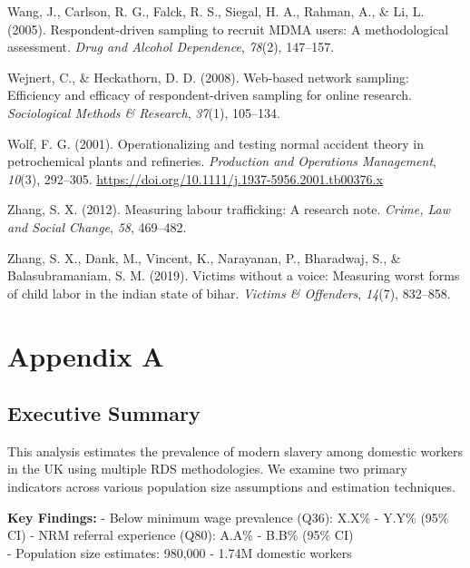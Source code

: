 \documentclass[
  12pt,
]{article}
\newlength{\cslhangindent}
\newenvironment{CSLReferences}[2] %
 {\begin{list}{}{%
  \setlength{\itemindent}{0pt}
  \setlength{\leftmargin}{0pt}
  \setlength{\parsep}{0pt}
  \ifodd #1
   \setlength{\leftmargin}{\cslhangindent}
   \setlength{\itemindent}{-1\cslhangindent}
  \fi
  \setlength{\itemsep}{#2\baselineskip}}}
 {\end{list}}
\theoremstyle{plain}
\theoremstyle{definition}
\begin{document}
\begin{CSLReferences}{1}{0}
Wang, J., Carlson, R. G., Falck, R. S., Siegal, H. A., Rahman, A., \&
Li, L. (2005). Respondent-driven sampling to recruit {MDMA} users: A
methodological assessment. \emph{Drug and Alcohol Dependence},
\emph{78}(2), 147--157.

Wejnert, C., \& Heckathorn, D. D. (2008). Web-based network sampling:
Efficiency and efficacy of respondent-driven sampling for online
research. \emph{Sociological Methods \& Research}, \emph{37}(1),
105--134.

Wolf, F. G. (2001). Operationalizing and testing normal accident theory
in petrochemical plants and refineries. \emph{Production and Operations
Management}, \emph{10}(3), 292--305.
\url{https://doi.org/10.1111/j.1937-5956.2001.tb00376.x}

Zhang, S. X. (2012). Measuring labour trafficking: A research note.
\emph{Crime, Law and Social Change}, \emph{58}, 469--482.

Zhang, S. X., Dank, M., Vincent, K., Narayanan, P., Bharadwaj, S., \&
Balasubramaniam, S. M. (2019). Victims without a voice: Measuring worst
forms of child labor in the indian state of bihar. \emph{Victims \&
Offenders}, \emph{14}(7), 832--858.

\end{CSLReferences}

\newpage

\appendix

\section{Appendix A}\label{appendix-a}

\subsection{Executive Summary}\label{executive-summary}

This analysis estimates the prevalence of modern slavery among domestic
workers in the UK using multiple RDS methodologies. We examine two
primary indicators across various population size assumptions and
estimation techniques.

\textbf{Key Findings:} - Below minimum wage prevalence (Q36): X.X\% -
Y.Y\% (95\% CI) - NRM referral experience (Q80): A.A\% - B.B\% (95\%
CI)\\
- Population size estimates: 980,000 - 1.74M domestic workers
\end{document}
